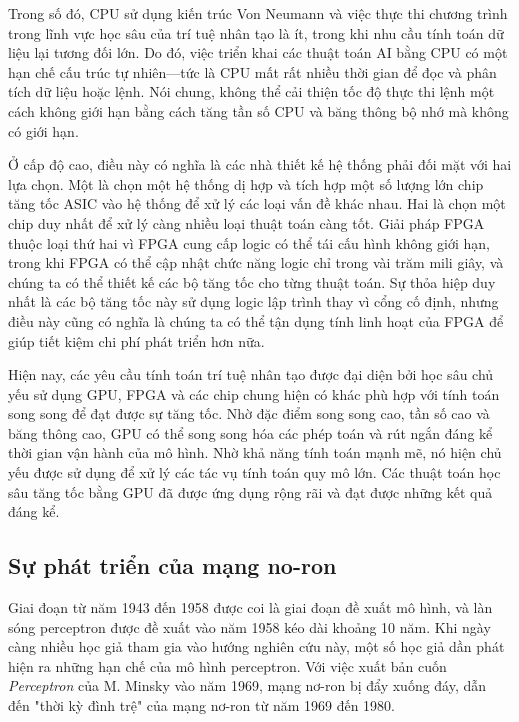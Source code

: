 \documentclass[a4paper]{article}
\begin{document}
Trong số đó, CPU sử dụng kiến trúc Von Neumann và việc thực thi chương trình trong lĩnh vực học sâu của trí tuệ nhân tạo là ít, trong khi nhu cầu tính toán dữ liệu lại tương đối lớn. Do đó, việc triển khai các thuật toán AI bằng CPU có một hạn chế cấu trúc tự nhiên—tức là CPU mất rất nhiều thời gian để đọc và phân tích dữ liệu hoặc lệnh. Nói chung, không thể cải thiện tốc độ thực thi lệnh một cách không giới hạn bằng cách tăng tần số CPU và băng thông bộ nhớ mà không có giới hạn.

Ở cấp độ cao, điều này có nghĩa là các nhà thiết kế hệ thống phải đối mặt với hai lựa chọn. Một là chọn một hệ thống dị hợp và tích hợp một số lượng lớn chip tăng tốc ASIC vào hệ thống để xử lý các loại vấn đề khác nhau. Hai là chọn một chip duy nhất để xử lý càng nhiều loại thuật toán càng tốt. Giải pháp FPGA thuộc loại thứ hai vì FPGA cung cấp logic có thể tái cấu hình không giới hạn, trong khi FPGA có thể cập nhật chức năng logic chỉ trong vài trăm mili giây, và chúng ta có thể thiết kế các bộ tăng tốc cho từng thuật toán. Sự thỏa hiệp duy nhất là các bộ tăng tốc này sử dụng logic lập trình thay vì cổng cố định, nhưng điều này cũng có nghĩa là chúng ta có thể tận dụng tính linh hoạt của FPGA để giúp tiết kiệm chi phí phát triển hơn nữa.

Hiện nay, các yêu cầu tính toán trí tuệ nhân tạo được đại diện bởi học sâu chủ yếu sử dụng GPU, FPGA và các chip chung hiện có khác phù hợp với tính toán song song để đạt được sự tăng tốc. Nhờ đặc điểm song song cao, tần số cao và băng thông cao, GPU có thể song song hóa các phép toán và rút ngắn đáng kể thời gian vận hành của mô hình. Nhờ khả năng tính toán mạnh mẽ, nó hiện chủ yếu được sử dụng để xử lý các tác vụ tính toán quy mô lớn. Các thuật toán học sâu tăng tốc bằng GPU đã được ứng dụng rộng rãi và đạt được những kết quả đáng kể.
\subsection{Sự phát triển của mạng no-ron}

Giai đoạn từ năm 1943 đến 1958 được coi là giai đoạn đề xuất mô hình, và làn sóng perceptron được đề xuất vào năm 1958 kéo dài khoảng 10 năm. Khi ngày càng nhiều học giả tham gia vào hướng nghiên cứu này, một số học giả dần phát hiện ra những hạn chế của mô hình perceptron. Với việc xuất bản cuốn \textit{Perceptron} của M. Minsky vào năm 1969, mạng nơ-ron bị đẩy xuống đáy, dẫn đến "thời kỳ đình trệ" của mạng nơ-ron từ năm 1969 đến 1980.
 
\end{document}
